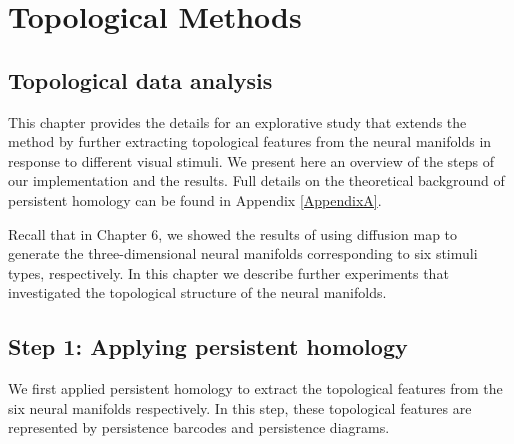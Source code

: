 \chapter{Topological Methods}
\label{Appendix-tda-results} 

\section{Topological data analysis}
This chapter provides the details for an explorative study that extends the method by further extracting topological features from the neural manifolds in response to different visual stimuli. We present here an overview of the steps of our implementation and the results. Full details on the theoretical background of persistent homology can be found in Appendix \ref{AppendixA}. 

Recall that in Chapter 6, we showed the results of using diffusion map to generate the three-dimensional neural manifolds corresponding to six stimuli types, respectively. In this chapter we describe further experiments that investigated the topological structure of the neural manifolds.


\section{Step 1: Applying persistent homology}
We first applied persistent homology to extract the topological features from  the six neural manifolds respectively. In this step, these topological features are represented by persistence barcodes and persistence diagrams.

